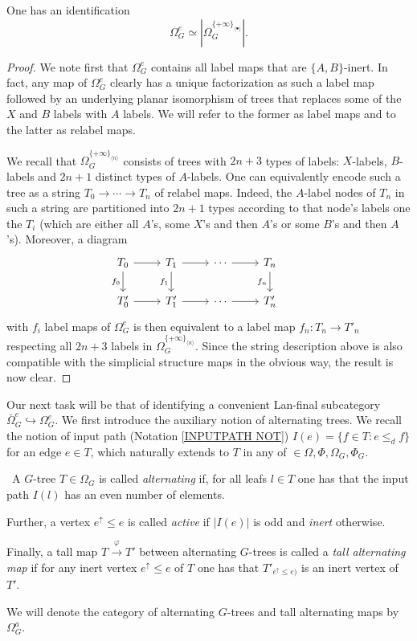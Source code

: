 \documentclass[a4paper,10pt]{article}%
\begin{document}
\begin{proposition}
  One has an identification
  \[
  \Omega_G^e \simeq 
  |\Omega_{G}^{\{+\infty\}_{\langle \bullet \rangle}}|.
  \]
\end{proposition}


\begin{proof}
  We note first that $\Omega_{G}^e$ contains all label maps that are $\{A,B\}$-inert. In fact, any map of $\Omega_{G}^e$ clearly has a unique factorization as such a label map followed by an underlying planar isomorphism of trees that replaces some of the $X$ and $B$ labels with $A$ labels.
  We will refer to the former as label maps and to the latter as relabel maps.

  We recall that 
  $\Omega_{G}^{\{+\infty\}_{\langle n \rangle}}$
  consists of trees with $2n+3$ types of labels: 
  $X$-labels, $B$-labels and $2n+1$ distinct types of $A$-labels.
  One can equivalently encode such a tree as a string 
  $T_0 \to \cdots \to T_n$
  of relabel maps. Indeed, the $A$-label nodes of $T_n$ in such a string are partitioned into $2n+1$ types according to that node's labels one the $T_i$ (which are either all $A$'s, some $X$'s and then $A$'s or some $B$'s and then $A$'s).
  Moreover, a diagram
  \[
  \begin{tikzcd}
    T_0 \ar{r} \ar{d}[swap]{f_0} & 
    T_1 \ar{r} \ar{d}[swap]{f_1} & 
    \cdots \ar{r} &
    T_n \ar{d}[swap]{f_n} &
    \\
    T'_0 \ar{r} &
    T'_1 \ar{r} &
    \cdots \ar{r} &
    T'_n 
  \end{tikzcd}
  \]
  with $f_i$ label maps of $\Omega^{e}_G$ is then equivalent to a label map $f_n \colon T_n \to T'_n$ respecting all $2n+3$ labels 
  in $\Omega_{G}^{\{+\infty\}_{\langle n \rangle}}$.
  Since the string description above is also compatible with the simplicial structure maps in the obvious way, 
  the result is now clear. 
\end{proof}


Our next task will be that of identifying a convenient Lan-final subcategory $\bar{\Omega}_G^{e} \hookrightarrow \Omega_G^e$.
We first introduce the auxiliary notion of alternating trees.
We recall the notion of input path (Notation \ref{INPUTPATH NOT})
$I(e) = \{f \in T \colon e \leq_d f\}$ for an edge $e \in T$, which naturally extends to $T$ in any of $\in \Omega, \Phi, \Omega_G, \Phi_G$.

\begin{definition}\
  A $G$-tree $T \in \Omega_G$ is called \textit{alternating} if, for all leafs $l \in T$ one has that the input path $I(l)$ has an even number of elements.

  Further, a vertex $e^{\uparrow} \leq e$ is called \textit{active}
  if $|I(e)|$ is odd and \textit{inert} otherwise.

  Finally, a tall map $T \xrightarrow{\varphi} T'$ between alternating $G$-trees is called a 
  \textit{tall alternating map}
  if for any inert vertex $e^{\uparrow} \leq e$ of $T$ one has that 
  $T'_{ e^{\uparrow} \leq e)}$ is an inert vertex of $T'$.

  We will denote the category of alternating $G$-trees and tall alternating maps by $\Omega_G^a$.
\end{definition}
\end{document}
